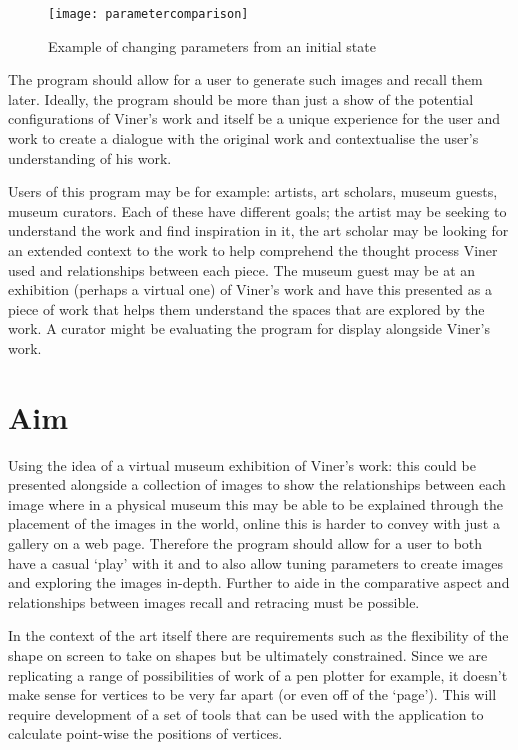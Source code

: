 \begin{figure}[H]
    \texttt{[image: parametercomparison]}
    \caption{Example of changing parameters from an initial state}
\end{figure}

The program should allow for a user to generate such images and recall them
later. Ideally, the program should be more than just a show of the potential
configurations of Viner's work and itself be a unique experience for the user
and work to create a dialogue with the original work and contextualise the
user's understanding of his work.

Users of this program may be for example: artists, art scholars, museum guests,
museum curators. Each of these have different goals; the artist may be seeking
to understand the work and find inspiration in it, the art scholar may be
looking for an extended context to the work to help comprehend the thought
process Viner used and relationships between each piece. The museum guest may be
at an exhibition (perhaps a virtual one) of Viner's work and have this presented
as a piece of work that helps them understand the spaces that are explored by
the work. A curator might be evaluating the program for display alongside
Viner's work.

\section{Aim}
Using the idea of a virtual museum exhibition of Viner's work: this could be
presented alongside a collection of images to show the relationships between
each image where in a physical museum this may be able to be explained through
the placement of the images in the world, online this is harder to convey with
just a gallery on a web page. Therefore the program should allow for a user to
both have a casual `play' with it and to also allow tuning parameters to create
images and exploring the images in-depth. Further to aide in the comparative
aspect and relationships between images recall and retracing must be possible.

In the context of the art itself there are requirements such as the flexibility
of the shape on screen to take on shapes but be ultimately constrained. Since we
are replicating a range of possibilities of work of a pen plotter for example,
it doesn't make sense for vertices to be very far apart (or even off of the
`page'). This will require development of a set of tools that can be used with
the application to calculate point-wise the positions of vertices.

